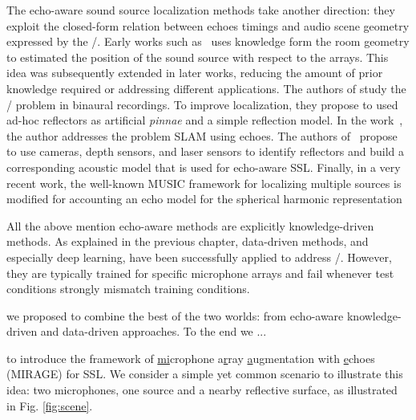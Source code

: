 \mynewline
The echo-aware sound source localization methods take another direction: they exploit the closed-form relation between echoes timings and audio scene geometry expressed by the \ISMdef/.
Early works such as~ uses knowledge form the room geometry to estimated the position of the sound source with respect to the arrays.
This idea was subsequently extended in later works, reducing the amount of prior knowledge required or addressing different applications.
The authors of   study the \SSL/ problem in binaural recordings.
To improve localization, they propose to used ad-hoc reflectors as artificial \textit{pinnae} and a simple reflection model.
In the work~, the author addresses the problem \ac{SLAM} using echoes.
The authors of~ propose to use cameras, depth sensors, and laser sensors to identify reflectors and build a corresponding acoustic model that is used
for echo-aware \ac{SSL}.
Finally, in a very recent work, the well-known \ac{MUSIC} framework for localizing multiple sources is modified for accounting an echo model for the spherical harmonic representation~

\mynewline
All the above mention echo-aware methods are explicitly knowledge-driven methods.
As explained in the previous chapter, data-driven methods, and especially deep learning, have been successfully applied to address \SSL/.
However, they are typically trained for specific microphone arrays and fail whenever test conditions strongly mismatch training conditions.

 \cite{di2019mirage} we proposed to combine the best of the two worlds:
from echo-aware knowledge-driven and data-driven approaches.
To the end we ...

to introduce the framework of \underline{mi}crophone a\underline{r}ray
\underline{a}u\underline{g}mentation with \underline{e}choes (MIRAGE) for SSL.
We consider a simple yet common scenario to illustrate this idea:
two microphones, one source and a nearby reflective surface, as illustrated in Fig. \cref{fig:scene}.

